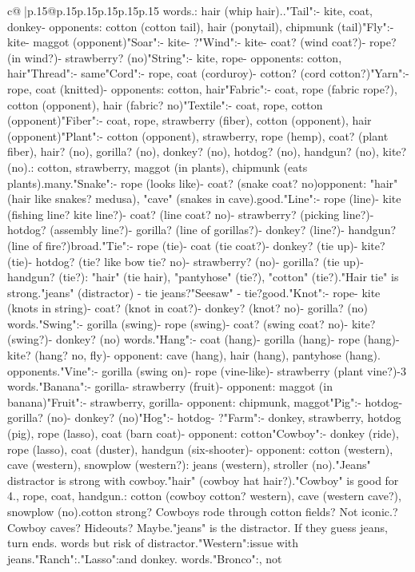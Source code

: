 \documentclass{article}
\begin{document}
{\begin{supertabular}{c@{$\;$}|p{.15\linewidth}@{}p{.15\linewidth}p{.15\linewidth}p{.15\linewidth}p{.15\linewidth}p{.15\linewidth}}
{{{words.\nOpponent: hair (whip hair).\nRisky.\n\n"Tail":\n- kite, coat, donkey\n- opponents: cotton (cotton tail), hair (ponytail), chipmunk (tail)\n\n"Fly":\n- kite\n- maggot (opponent)\n\n"Soar":\n- kite\n- ?\n\n"Wind":\n- kite\n- coat? (wind coat?)\n- rope? (in wind?)\n- strawberry? (no)\n\n"String":\n- kite, rope\n- opponents: cotton, hair\n\n"Thread":\n- same\n\n"Cord":\n- rope, coat (corduroy)\n- cotton? (cord cotton?)\n\n"Yarn":\n- rope, coat (knitted)\n- opponents: cotton, hair\n\n"Fabric":\n- coat, rope (fabric rope?), cotton (opponent), hair (fabric? no)\n\n"Textile":\n- coat, rope, cotton (opponent)\n\n"Fiber":\n- coat, rope, strawberry (fiber), cotton (opponent), hair (opponent)\n\n"Plant":\n- cotton (opponent), strawberry, rope (hemp), coat? (plant fiber), hair? (no), gorilla? (no), donkey? (no), hotdog? (no), handgun? (no), kite? (no).\nOpponent: cotton, strawberry, maggot (in plants), chipmunk (eats plants).\nToo many.\n\n"Snake":\n- rope (looks like)\n- coat? (snake coat? no)\nBut opponent: "hair" (hair like snakes? medusa), "cave" (snakes in cave).\nNot good.\n\n"Line":\n- rope (line)\n- kite (fishing line? kite line?)\n- coat? (line coat? no)\n- strawberry? (picking line?)\n- hotdog? (assembly line?)\n- gorilla? (line of gorillas?)\n- donkey? (line?)\n- handgun? (line of fire?)\nToo broad.\n\n"Tie":\n- rope (tie)\n- coat (tie coat?)\n- donkey? (tie up)\n- kite? (tie)\n- hotdog? (tie? like bow tie? no)\n- strawberry? (no)\n- gorilla? (tie up)\n- handgun? (tie?)\nOpponent: "hair" (tie hair), "pantyhose" (tie?), "cotton" (tie?).\n"Hair tie" is strong.\nAlso "jeans" (distractor) - tie jeans?\n"Seesaw" - tie?\nNot good.\n\n"Knot":\n- rope\n- kite (knots in string)\n- coat? (knot in coat?)\n- donkey? (knot? no)\n- gorilla? (no) words.\n\n"Swing":\n- gorilla (swing)\n- rope (swing)\n- coat? (swing coat? no)\n- kite? (swing?)\n- donkey? (no) words.\n\n"Hang":\n- coat (hang)\n- gorilla (hang)\n- rope (hang)\n- kite? (hang? no, fly)\n- opponent: cave (hang), hair (hang), pantyhose (hang). opponents.\n\n"Vine":\n- gorilla (swing on)\n- rope (vine-like)\n- strawberry (plant vine?)-3 words.\n\n"Banana":\n- gorilla\n- strawberry (fruit)\n- opponent: maggot (in banana)\n\n"Fruit":\n- strawberry, gorilla\n- opponent: chipmunk, maggot\n\n"Pig":\n- hotdog\n- gorilla? (no)\n- donkey? (no)\n\n"Hog":\n- hotdog\n- ?\n\n"Farm":\n- donkey, strawberry, hotdog (pig), rope (lasso), coat (barn coat)\n- opponent: cotton\n\n"Cowboy":\n- donkey (ride), rope (lasso), coat (duster), handgun (six-shooter)\n- opponent: cotton (western), cave (western), snowplow (western?)\nDistractors: jeans (western), stroller (no).\n"Jeans" distractor is strong with cowboy.\nAlso "hair" (cowboy hat hair?).\n"Cowboy" is good for 4.\nDonkey, rope, coat, handgun.\nOpponents: cotton (cowboy cotton? western), cave (western cave?), snowplow (no).\nIs cotton strong? Cowboys rode through cotton fields? Not iconic.\nCave? Cowboy caves? Hideouts? Maybe.\nBut "jeans" is the distractor. If they guess jeans, turn ends. words but risk of distractor.\n\n"Western":\nSame issue with jeans.\n\n"Ranch":\nSame.\n\n"Lasso":\nRope and donkey. words.\n\n"Bronco":\nHorse, not }}}
\end{supertabular}}
\end{document}

